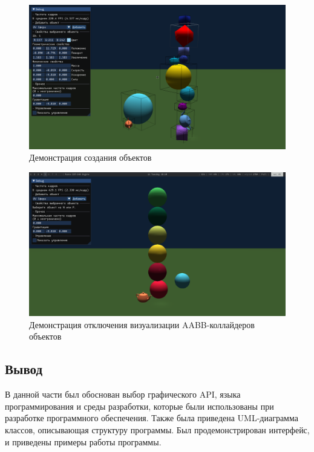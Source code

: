 \begin{figure}[H]
	\centering
	\includegraphics[width=\textwidth]{img/demo-spawn.png}
	\caption{Демонстрация создания объектов}
	\label{fig:spawn}
\end{figure}

\begin{figure}[H]
	\centering
	\includegraphics[width=\textwidth]{img/demo-nodbg.png}
	\caption{Демонстрация отключения визуализации AABB-коллайдеров объектов}
	\label{fig:nodbg}
\end{figure}

\newpage
\subsection{Вывод}

В данной части был обоснован выбор графического API, языка программирования и среды разработки, которые были использованы при разработке программного обеспечения.
Также была приведена UML-диаграмма классов, описывающая структуру программы.
Был продемонстрирован интерфейс, и приведены примеры работы программы.
